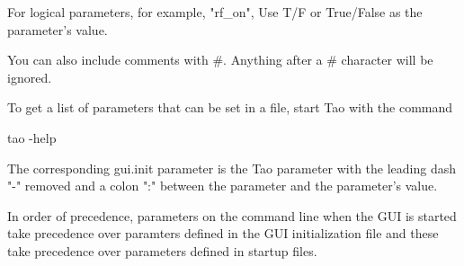 For logical parameters, for example, "rf_on", Use T/F or True/False as the parameter's value.

You can also include comments with \#.  Anything after a \# character will be ignored.

To get a list of parameters that can be set in a  file, start Tao with the command
\begin{example}
  tao -help
\end{example}
The corresponding gui.init parameter is the Tao parameter with the leading dash "-" removed and a
colon ":" between the parameter and the parameter's value.

In order of precedence, parameters on the command line when the GUI is started take precedence over paramters
defined in the GUI initialization file and these take precedence over parameters defined in \tao startup files.

